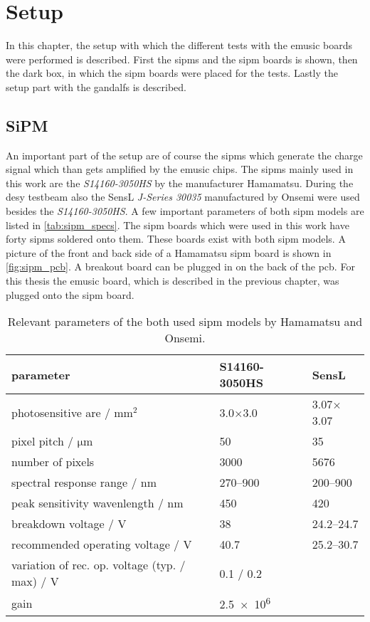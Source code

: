 \chapter{Setup}

In this chapter, the setup with which the different tests with the \ac{emusic} boards were performed is described.
First the \acp{sipm} and the \ac{sipm} boards is shown, then the dark box, in which the \ac{sipm} boards were placed for the tests.
Lastly the setup part with the \acp{gandalf} is described.

\section{SiPM}
An important part of the setup are of course the \acp{sipm} which generate the charge signal which than gets amplified by the \ac{emusic} chips.
The \acp{sipm} mainly used in this work are the \textit{S14160-3050HS} by the manufacturer Hamamatsu.
During the \ac{desy} testbeam also the SensL \textit{J-Series 30035} manufactured by Onsemi were used besides the \textit{S14160-3050HS}.
A few important parameters of both \ac{sipm} models are listed in \autoref{tab:sipm_specs}.
The \ac{sipm} boards which were used in this work have forty \acp{sipm} soldered onto them.
These boards exist with both \ac{sipm} models.
A picture of the front and back side of a Hamamatsu \ac{sipm} board is shown in \autoref{fig:sipm_pcb}.
A breakout board can be plugged in on the back of the \ac{pcb}.
For this thesis the \ac{emusic} board, which is described in the previous chapter, was plugged onto the \ac{sipm} board.
\begin{table}
	\centering
	\caption[SiPM parameters]{Relevant parameters of the both used \ac{sipm} models by Hamamatsu and Onsemi. \cite{}}
	\label{tab:sipm_specs}
	\renewcommand{\arraystretch}{1.3}
	\begin{tabularx}{\textwidth}{Xp{}p{}}
	    \toprule
	    parameter								& S14160-3050HS		& SensL			\\\midrule
	    photosensitive are / $\si{\milli\meter\squared}$			& 3.0$\times$3.0	& 3.07$\times$3.07	\\
	    pixel pitch / $\si{\micro\meter}$					& 50			& 35			\\
	    number of pixels							& 3000			& \num{5676}		\\
	    spectral response range / $\si{\nano\meter}$			& \numrange{270}{900}	& \numrange{200}{900}	\\
	    peak sensitivity wavenlength / $\si{\nano\meter}$			& 450			& 420			\\
	    breakdown voltage / $\si{\volt}$					& 38			& \numrange{24.2}{24.7}	\\
	    recommended operating voltage / $\si{\volt}$			& 40.7			& \numrange{25.2}{30.7}	\\
	    variation of rec. op. voltage (typ. / max) / $\si{\volt}$		& 0.1 / 0.2		&			\\
	    gain								& \num{2.5e6}		&			\\
	    \bottomrule
	\end{tabularx}
	\renewcommand{\arraystretch}{1}
\end{table} 
